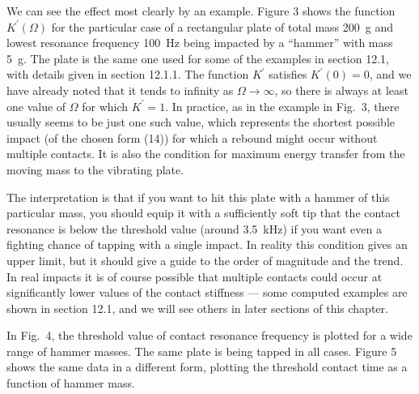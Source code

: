   We can see the effect most clearly by an example. Figure 3 shows the function 
  $K^\prime(\Omega)$ for the particular case of a rectangular plate of total 
  mass 200~g and lowest resonance frequency 100~Hz being impacted by a 
  ``hammer'' with mass 5~g. The plate is the same one used for some of the 
  examples in section 12.1, with details given in section 12.1.1. The function 
  $K^\prime$ satisfies $K^\prime(0)=0$, and we have already noted that it tends 
  to infinity as $\Omega \rightarrow \infty$, so there is always at least one 
  value of $\Omega$ for which $K^\prime=1$. In practice, as in the example in 
  Fig.\ 3, there usually seems to be just one such value, which represents the 
  shortest possible impact (of the chosen form (14)) for which a rebound might 
  occur without multiple contacts. It is also the condition for maximum energy 
  transfer from the moving mass to the vibrating plate. 

  The interpretation is that if you want to hit this plate with a hammer of 
  this particular mass, you should equip it with a sufficiently soft tip that 
  the contact resonance is below the threshold value (around 3.5~kHz) if you 
  want even a fighting chance of tapping with a single impact. In reality this 
  condition gives an upper limit, but it should give a guide to the order of 
  magnitude and the trend. In real impacts it is of course possible that 
  multiple contacts could occur at significantly lower values of the contact 
  stiffness --- some computed examples are shown in section 12.1, and we will 
  see others in later sections of this chapter. 

  In Fig.\ 4, the threshold value of contact resonance frequency is plotted for 
  a wide range of hammer masses. The same plate is being tapped in all cases. 
  Figure 5 shows the same data in a different form, plotting the threshold 
  contact time as a function of hammer mass. 



